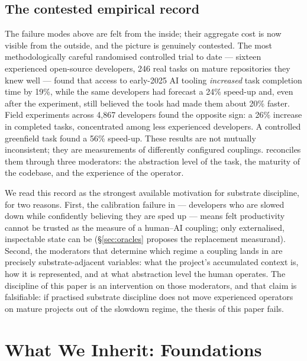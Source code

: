 \documentclass[11pt,a4paper,twocolumn]{article}
\begin{document}
\subsection*{The contested empirical record}
The failure modes above are felt from the inside; their aggregate
cost is now visible from the outside, and the picture is genuinely
contested. The most methodologically careful randomised controlled
trial to date \citep{becker2025metr} --- sixteen experienced
open-source developers, 246 real tasks on mature repositories they
knew well --- found that access to early-2025 AI tooling
\emph{increased} task completion time by 19\%, while the same
developers had forecast a 24\% speed-up and, even after the
experiment, still believed the tools had made them about 20\%
faster. Field experiments across 4{,}867 developers
\citep{cui2026effects} found the opposite sign: a 26\% increase in
completed tasks, concentrated among less experienced developers.
A controlled greenfield task \citep{peng2023copilot} found a 56\%
speed-up. These results are not mutually inconsistent; they are
measurements of differently configured couplings.
\citet{farrag2026paradox} reconciles them through three
moderators: the abstraction level of the task, the maturity of the
codebase, and the experience of the operator.

We read this record as the strongest available motivation for
substrate discipline, for two reasons. First, the calibration
failure in \citet{becker2025metr} --- developers who are slowed
down while confidently believing they are sped up --- means felt
productivity cannot be trusted as the measure of a human--AI
coupling; only externalised, inspectable state can be
(\S\ref{sec:oracles} proposes the replacement measurand). Second, the
moderators that determine which regime a coupling lands in are
precisely substrate-adjacent variables: what the project's
accumulated context is, how it is represented, and at what
abstraction level the human operates. The discipline of this paper
is an intervention on those moderators, and that claim is
falsifiable: if practised substrate discipline does not move
experienced operators on mature projects out of the slowdown
regime, the thesis of this paper fails.

\section{What We Inherit: Foundations}
\label{sec:foundations}
\end{document}
